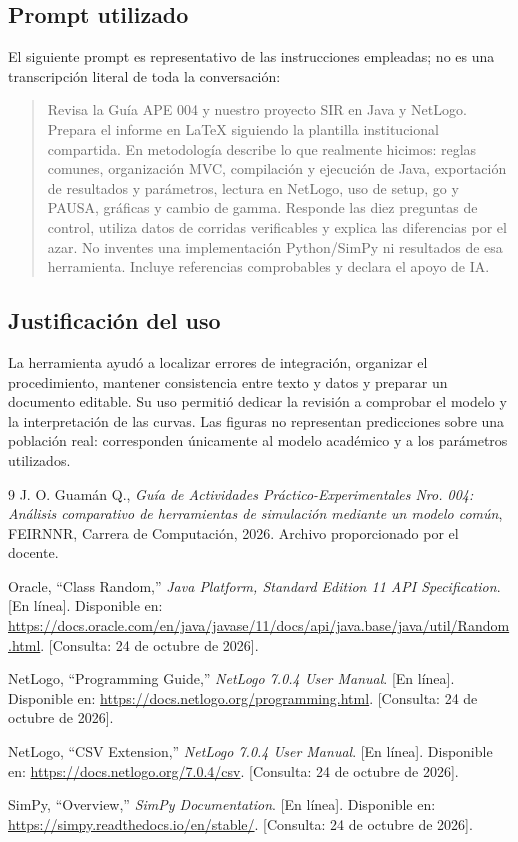 \documentclass[11pt,a4paper]{article}
\begin{document}
\subsection{Prompt utilizado}
El siguiente prompt es representativo de las instrucciones empleadas; no es una transcripción literal de toda la conversación:
\begin{quote}\small
Revisa la Guía APE 004 y nuestro proyecto SIR en Java y NetLogo. Prepara el informe en \LaTeX{} siguiendo la plantilla institucional compartida. En metodología describe lo que realmente hicimos: reglas comunes, organización MVC, compilación y ejecución de Java, exportación de resultados y parámetros, lectura en NetLogo, uso de setup, go y PAUSA, gráficas y cambio de gamma. Responde las diez preguntas de control, utiliza datos de corridas verificables y explica las diferencias por el azar. No inventes una implementación Python/SimPy ni resultados de esa herramienta. Incluye referencias comprobables y declara el apoyo de IA.
\end{quote}

\subsection{Justificación del uso}
La herramienta ayudó a localizar errores de integración, organizar el procedimiento, mantener consistencia entre texto y datos y preparar un documento editable. Su uso permitió dedicar la revisión a comprobar el modelo y la interpretación de las curvas. Las figuras no representan predicciones sobre una población real: corresponden únicamente al modelo académico y a los parámetros utilizados.

\renewcommand{\refname}{\thesection. Bibliografía}
\begin{thebibliography}{9}
J. O. Guamán Q., \emph{Guía de Actividades Práctico-Experimentales Nro. 004: Análisis comparativo de herramientas de simulación mediante un modelo común}, FEIRNNR, Carrera de Computación, 2026. Archivo proporcionado por el docente.

Oracle, ``Class Random,'' \emph{Java Platform, Standard Edition 11 API Specification}. [En línea]. Disponible en: \url{https://docs.oracle.com/en/java/javase/11/docs/api/java.base/java/util/Random.html}. [Consulta: 24 de octubre de 2026].

NetLogo, ``Programming Guide,'' \emph{NetLogo 7.0.4 User Manual}. [En línea]. Disponible en: \url{https://docs.netlogo.org/programming.html}. [Consulta: 24 de octubre de 2026].

NetLogo, ``CSV Extension,'' \emph{NetLogo 7.0.4 User Manual}. [En línea]. Disponible en: \url{https://docs.netlogo.org/7.0.4/csv}. [Consulta: 24 de octubre de 2026].

SimPy, ``Overview,'' \emph{SimPy Documentation}. [En línea]. Disponible en: \url{https://simpy.readthedocs.io/en/stable/}. [Consulta: 24 de octubre de 2026].
\end{thebibliography}
\end{document}
